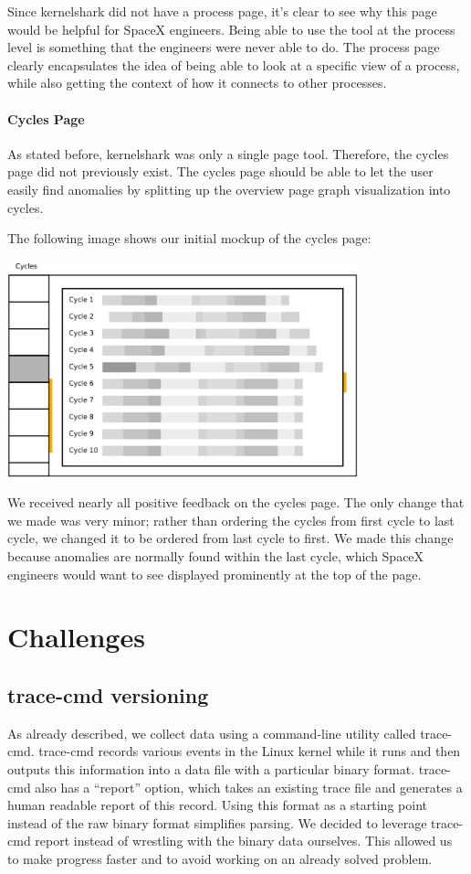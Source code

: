 \documentclass{hmcclinic}
\begin{document}
Since kernelshark did not have a process page, it's clear to see why this page would be helpful for SpaceX engineers. Being able to use the tool at the process level is something that the engineers were never able to do. The process page clearly encapsulates the idea of being able to look at a specific view of a process, while also getting the context of how it connects to other processes.

\subsubsection{Cycles Page}

As stated before, kernelshark was only a single page tool. Therefore, the cycles page did not previously exist. The cycles page should be able to let the user easily find anomalies by splitting up the overview page graph visualization into cycles.

The following image shows our initial mockup of the cycles page:

\begin{center}
\includegraphics[width=4in]{oldcycles.png}
\end{center}

We received nearly all positive feedback on the cycles page. The only change that we made was very minor; rather than ordering the cycles from first cycle to last cycle, we changed it to be ordered from last cycle to first. We made this change because anomalies are normally found within the last cycle, which SpaceX engineers would want to see displayed prominently at the top of the page.


\chapter{Challenges}
\section{trace-cmd versioning} %
  As already described, we collect data using a command-line utility called
  trace-cmd. trace-cmd records various events in the Linux kernel while it runs
  and then outputs this information into a data file with a particular binary
  format. trace-cmd also has a ``report'' option, which takes an existing trace
  file and generates a human readable report of this record. Using this format
  as a starting point instead of the raw binary format simplifies parsing.
  We decided to leverage trace-cmd report instead of wrestling with the binary
  data ourselves. This allowed us to make progress faster and to avoid working
  on an already solved problem.
\end{document}
